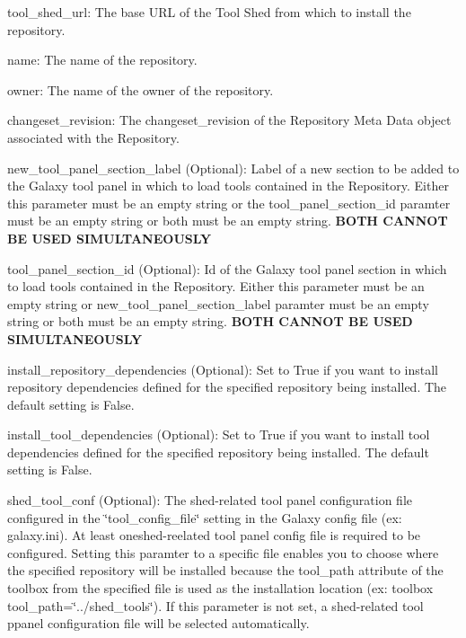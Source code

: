 \begin{DoxyItemize}
\item tool\-\_\-shed\-\_\-url\-: The base U\-R\-L of the Tool Shed from which to install the repository.
\item name\-: The name of the repository.
\item owner\-: The name of the owner of the repository.
\item changeset\-\_\-revision\-: The changeset\-\_\-revision of the Repository Meta Data object associated with the Repository.
\item new\-\_\-tool\-\_\-panel\-\_\-section\-\_\-label (Optional)\-: Label of a new section to be added to the Galaxy tool panel in which to load tools contained in the Repository. Either this parameter must be an empty string or the tool\-\_\-panel\-\_\-section\-\_\-id paramter must be an empty string or both must be an empty string. {\bfseries B\-O\-T\-H C\-A\-N\-N\-O\-T B\-E U\-S\-E\-D S\-I\-M\-U\-L\-T\-A\-N\-E\-O\-U\-S\-L\-Y}
\item tool\-\_\-panel\-\_\-section\-\_\-id (Optional)\-: Id of the Galaxy tool panel section in which to load tools contained in the Repository. Either this parameter must be an empty string or new\-\_\-tool\-\_\-panel\-\_\-section\-\_\-label paramter must be an empty string or both must be an empty string. {\bfseries B\-O\-T\-H C\-A\-N\-N\-O\-T B\-E U\-S\-E\-D S\-I\-M\-U\-L\-T\-A\-N\-E\-O\-U\-S\-L\-Y}
\item install\-\_\-repository\-\_\-dependencies (Optional)\-: Set to True if you want to install repository dependencies defined for the specified repository being installed. The default setting is False.
\item install\-\_\-tool\-\_\-dependencies (Optional)\-: Set to True if you want to install tool dependencies defined for the specified repository being installed. The default setting is False.
\item shed\-\_\-tool\-\_\-conf (Optional)\-: The shed-\/related tool panel configuration file configured in the \char`\"{}tool\-\_\-config\-\_\-file\char`\"{} setting in the Galaxy config file (ex\-: galaxy.\-ini). At least oneshed-\/reelated tool panel config file is required to be configured. Setting this paramter to a specific file enables you to choose where the specified repository will be installed because the tool\-\_\-path attribute of the toolbox from the specified file is used as the installation location (ex\-: toolbox tool\-\_\-path=\char`\"{}../shed\-\_\-tools\char`\"{}). If this parameter is not set, a shed-\/related tool ppanel configuration file will be selected automatically. 
\end{DoxyItemize}\hypertarget{classGalaxyToolShedRepositories_a1fb80afb19a91ecb1e4a79c07a2092fa}{
}
